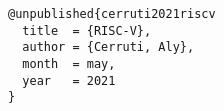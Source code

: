 \printbibliography

\begin{verbatim}
@unpublished{cerruti2021riscv
  title  = {RISC-V},
  author = {Cerruti, Aly},
  month  = may,
  year   = 2021
}
\end{verbatim}


